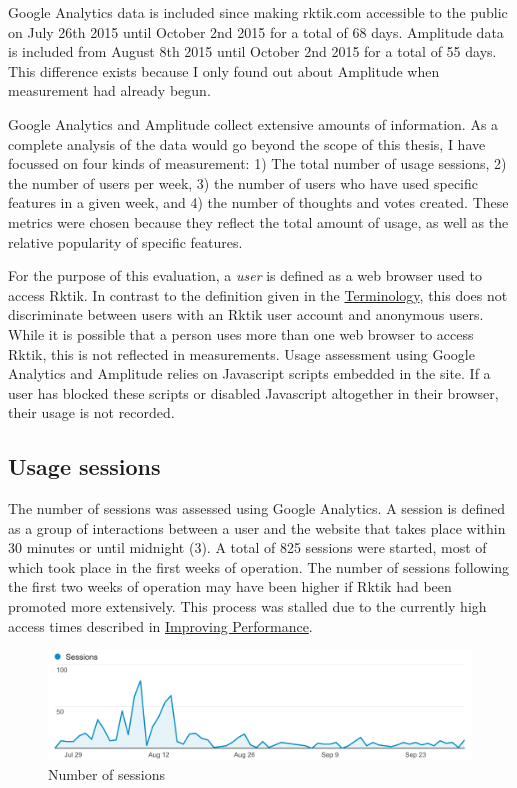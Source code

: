 Google Analytics data is included since making rktik.com accessible to
the public on July 26th 2015 until October 2nd 2015 for a total of 68
days. Amplitude data is included from August 8th 2015 until October 2nd
2015 for a total of 55 days. This difference exists because I only found
out about Amplitude when measurement had already begun.

Google Analytics and Amplitude collect extensive amounts of information.
As a complete analysis of the data would go beyond the scope of this
thesis, I have focussed on four kinds of measurement: 1) The total
number of usage sessions, 2) the number of users per week, 3) the number
of users who have used specific features in a given week, and 4) the
number of thoughts and votes created. These metrics were chosen because
they reflect the total amount of usage, as well as the relative
popularity of specific features.

For the purpose of this evaluation, a \emph{user} is defined as a web
browser used to access Rktik. In contrast to the definition given in the
\hyperref[terminology]{Terminology}, this does not discriminate between
users with an Rktik user account and anonymous users. While it is
possible that a person uses more than one web browser to access Rktik,
this is not reflected in measurements. Usage assessment using Google
Analytics and Amplitude relies on Javascript scripts embedded in the
site. If a user has blocked these scripts or disabled Javascript
altogether in their browser, their usage is not recorded.

\subsection{Usage sessions}\label{usage-sessions}

The number of sessions was assessed using Google Analytics. A session is
defined as a group of interactions between a user and the website that
takes place within 30 minutes or until midnight (3). A total of 825
sessions were started, most of which took place in the first weeks of
operation. The number of sessions following the first two weeks of
operation may have been higher if Rktik had been promoted more
extensively. This process was stalled due to the currently high access
times described in \hyperref[improving-performance]{Improving
Performance}.

\begin{figure}[htbp]
\centering
\includegraphics{img/eval_sessions.png}
\caption{Number of sessions}
\end{figure}

